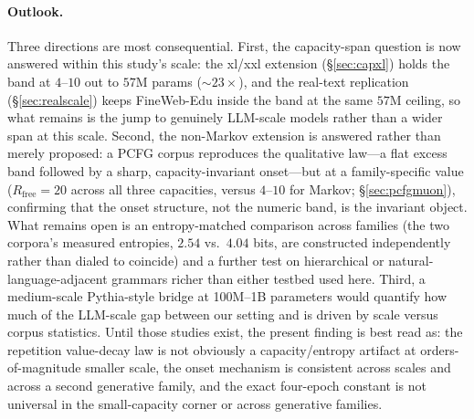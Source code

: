 \documentclass[11pt]{article}
\begin{document}
\paragraph{Outlook.}
Three directions are most consequential. First, the capacity-span question is now
answered within this study's scale: the xl/xxl extension (\S\ref{sec:capxl}) holds the
band at $4$--$10$ out to $57$M params (${\sim}23\times$), and the real-text
replication (\S\ref{sec:realscale}) keeps FineWeb-Edu inside the band at the same
$57$M ceiling, so what remains is the jump to genuinely LLM-scale models rather
than a wider span at this scale.
Second, the non-Markov extension is answered rather than merely
proposed: a PCFG corpus reproduces the qualitative law---a
flat excess band followed by a sharp, capacity-invariant onset---but at a family-specific
value ($R_{\mathrm{free}}=20$ across all three capacities, versus $4$--$10$ for Markov;
\S\ref{sec:pcfgmuon}), confirming that the onset structure, not the numeric band, is the
invariant object. What remains open is an entropy-matched comparison across families (the
two corpora's measured entropies, $2.54$ vs.\ $4.04$ bits, are constructed independently
rather than dialed to coincide) and a further test on hierarchical or
natural-language-adjacent grammars richer than either testbed used here. Third, a
medium-scale Pythia-style bridge at 100M--1B parameters would quantify how much of the
LLM-scale gap between our setting and \citet{muennighoff2023scaling} is driven by scale
versus corpus statistics. Until those studies exist, the present finding is best read as:
the repetition value-decay law is not obviously a capacity/entropy artifact at
orders-of-magnitude smaller scale, the onset mechanism is consistent across scales and
across a second generative family, and the exact four-epoch constant is not universal in
the small-capacity corner or across generative families.
\end{document}
